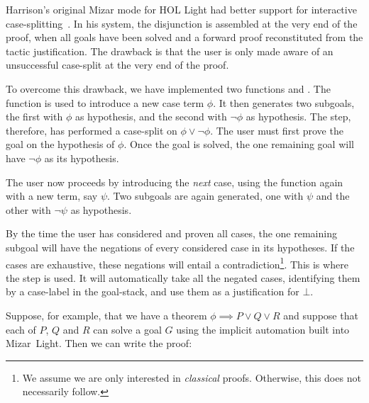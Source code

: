 Harrison's original Mizar mode for HOL Light had better support for interactive case-splitting~\cite{MizarHOL}. In his system, the disjunction is assembled at the very end of the proof, when all goals have been solved and a forward proof reconstituted from the tactic justification. The drawback is that the user is only made aware of an unsuccessful case-split at the very end of the proof.

To overcome this drawback, we have implemented two functions  and . The  function is used to introduce a new case term $\phi$. It then generates two subgoals, the first with $\phi$ as hypothesis, and the second with $\neg\phi$ as hypothesis. The  step, therefore, has performed a case-split on $\phi\vee\neg\phi$. The user must first prove the goal on the hypothesis of $\phi$. Once the goal is solved, the one remaining goal will have $\neg\phi$ as its hypothesis. 

The user now proceeds by introducing the \emph{next} case, using the  function again with a new term, say $\psi$. Two subgoals are again generated, one with $\psi$ and the other with $\neg\psi$ as hypothesis.

By the time the user has considered and proven all cases, the one remaining subgoal will have the negations of every considered case in its hypotheses. If the cases are exhaustive, these negations will entail a contradiction\footnote{We assume we are only interested in \emph{classical} proofs. Otherwise, this does not necessarily follow.}. This is where the  step is used. It will automatically take all the negated cases, identifying them by a case-label  in the goal-stack, and use them as a justification for $\bot$.

Suppose, for example, that we have a theorem $\phi \implies P \vee Q \vee R$ and suppose that each of $P$, $Q$ and $R$ can solve a goal $G$ using the implicit automation built into Mizar~Light. Then we can write the proof:

\vspace{0.5cm}
\begin{minipage}{\linewidth}
  \footnotesize






\end{minipage}
\vspace{0.5cm} 

